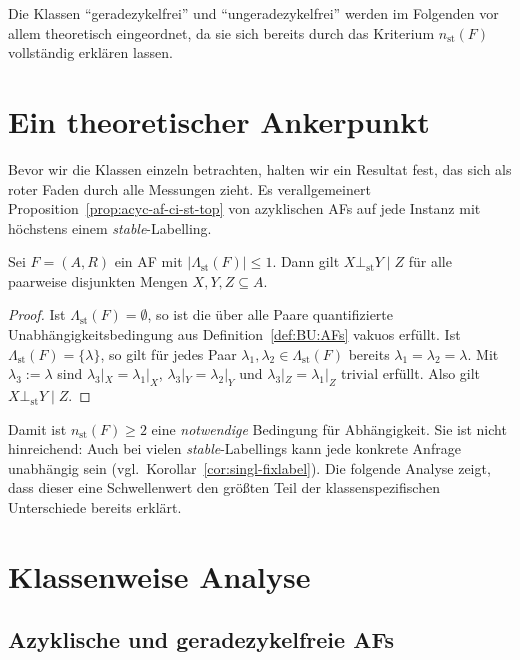 Die Klassen \enquote{geradezykelfrei} und \enquote{ungeradezykelfrei} werden im
Folgenden vor allem theoretisch eingeordnet, da sie sich bereits durch das
Kriterium \(n_{\mathrm{st}}(F)\) vollst\"andig erkl\"aren lassen.

\section{Ein theoretischer Ankerpunkt}
\label{subsec:gce-anker}

Bevor wir die Klassen einzeln betrachten, halten wir ein Resultat fest, das
sich als roter Faden durch alle Messungen zieht. Es verallgemeinert
Proposition~\ref{prop:acyc-af-ci-st-top} von azyklischen AFs auf jede Instanz
mit h\"ochstens einem \textit{stable}-Labelling.

\begin{Proposition}
    \label{prop:gce-leq1-indep}
    Sei \(F=(A,R)\) ein AF mit \(|\Lambda_{\mathrm{st}}(F)|\leq 1\). Dann gilt
    \(X\bot_{\mathrm{st}}Y\mid Z\) f\"ur alle paarweise disjunkten Mengen
    \(X,Y,Z\subseteq A\).
\end{Proposition}

\begin{proof}
    Ist \(\Lambda_{\mathrm{st}}(F)=\emptyset\), so ist die
    \"uber alle Paare quantifizierte Unabh\"angigkeitsbedingung aus
    Definition~\ref{def:BU:AFs} vakuos erf\"ullt. Ist
    \(\Lambda_{\mathrm{st}}(F)=\{\lambda\}\), so gilt f\"ur jedes Paar
    \(\lambda_1,\lambda_2\in\Lambda_{\mathrm{st}}(F)\) bereits
    \(\lambda_1=\lambda_2=\lambda\). Mit \(\lambda_3:=\lambda\) sind
    \(\lambda_3|_X=\lambda_1|_X\), \(\lambda_3|_Y=\lambda_2|_Y\) und
    \(\lambda_3|_Z=\lambda_1|_Z\) trivial erf\"ullt. Also gilt
    \(X\bot_{\mathrm{st}}Y\mid Z\).
\end{proof}

Damit ist \(n_{\mathrm{st}}(F)\geq 2\) eine \emph{notwendige} Bedingung f\"ur
Abh\"angigkeit. Sie ist nicht hinreichend: Auch bei vielen
\textit{stable}-Labellings kann jede konkrete Anfrage unabh\"angig sein
(vgl.\ Korollar~\ref{cor:singl-fixlabel}). Die folgende Analyse zeigt, dass
dieser eine Schwellenwert den gr\"o\ss ten Teil der klassenspezifischen
Unterschiede bereits erkl\"art.

\section{Klassenweise Analyse}
\label{sec:gce-klassen}

\subsection{Azyklische und geradezykelfreie AFs}
\label{subsec:gce-acyc}


